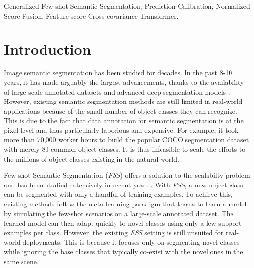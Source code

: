 \documentclass[journal]{IEEEtran}
\begin{document}
\begin{IEEEkeywords}
Generalized Few-shot Semantic Segmentation, Prediction Calibration, Normalized Score Fusion, Feature-score Cross-covariance Transformer.
\end{IEEEkeywords}

\section{Introduction}
\label{sec:intro}

Image semantic segmentation has been studied for decades. In the past 8-10 years, it has made arguably the largest advancements, thanks to the availability of large-scale annotated datasets and advanced deep segmentation models \cite{chen2017deeplab,zhao2017pyramid,chen2018encoder}.
However, existing semantic segmentation methods are still limited in  real-world applications because of the small number of object classes they can recognize. This is due to the fact that data annotation for semantic segmentation is at the pixel level and thus particularly laborious and expensive.
For example, it took more than 70,000 worker hours to build the popular COCO \cite{lin2014microsoft} segmentation dataset with merely 80 common object classes. It is thus infeasible to scale the efforts to the millions of object classes existing in the natural world. 

Few-shot Semantic Segmentation (\textit{FSS}) offers a solution to the scalabilty problem and has been studied extensively in recent years \cite{shaban2017one,wang2019panet,nguyen2019feature,wangfew,yang2020prototype,zhang2019canet,zhang2020sg,lu2021simpler}. With \textit{FSS}, a new object class can be segmented with only a handful of training examples. To achieve this, existing methods follow the meta-learning paradigm that learns to learn a model by simulating the few-shot scenarios on a large-scale annotated dataset. 
The learned model can then adapt quickly to novel classes using only a few support examples per class. However, the existing \textit{FSS} setting is still unsuited for real-world deployments. This is because it focuses only on segmenting novel classes while ignoring the base classes that typically co-exist with the novel ones in the same scene. 
\end{document}

